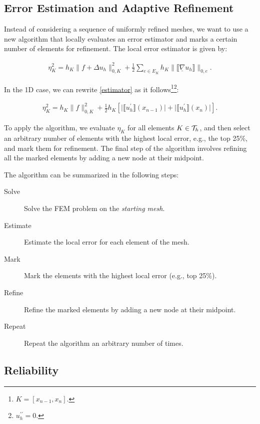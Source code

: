 \subsection{Error Estimation and Adaptive Refinement} \label{error_estimator}

Instead of considering a sequence of uniformly refined meshes, we want to use a new algorithm that locally evaluates an error estimator and marks a certain number of elements for refinement. The local error estimator is given by:

\begin{gather} \label{estimator}
	\eta_K^2 = h_K \lVert f + \Delta u_h \rVert_{0, K}^2 + \frac{1}{2} \sum_{e \in E_K} h_K \lVert \llbracket \underline{\nabla} u_h \rrbracket \rVert_{0, e}.
\end{gather}

In the 1D case, we can rewrite \ref{estimator} as it follows\footnote{$K = [x_{n - 1}, x_n]$.}\footnote{$u_h^{\prime \prime} = 0$.}:

\begin{gather}
	\eta_K^2 = h_K \lVert f \rVert_{0, K}^2 + \frac{1}{2} h_K \left[ \lvert \llbracket u_h^\prime \rrbracket (x_{n - 1}) \rvert + \lvert \llbracket u_h^\prime \rrbracket (x_n) \rvert \right].
\end{gather}

To apply the algorithm, we evaluate $\eta_K$ for all elements $K \in \mathcal{T}_h$, and then select an arbitrary number of elements with the highest local error, e.g., the top 25\%, and mark them for refinement. The final step of the algorithm involves refining all the marked elements by adding a new node at their midpoint.

The algorithm can be summarized in the following steps:

\begin{description}
	\item[Solve] Solve the FEM problem on the \textit{starting mesh}.
	\item[Estimate] Estimate the local error for each element of the mesh.
	\item[Mark] Mark the elements with the highest local error (e.g., top 25\%).
	\item[Refine] Refine the marked elements by adding a new node at their midpoint.  
	\item[Repeat] Repeat the algorithm an arbitrary number of times. 
\end{description}

\newpage
\subsection{Reliability}

